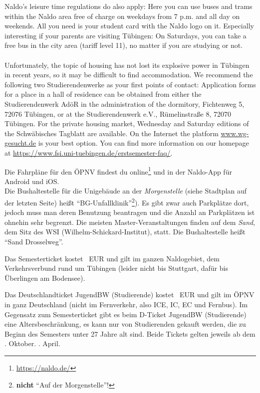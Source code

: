     Naldo's leisure time regulations do also apply: Here you can use buses and trams within the Naldo area free of charge on weekdays from 7 p.m. and all day on weekends. All you need is your student card with the Naldo logo on it.
    Especially interesting if your parents are visiting Tübingen: On Saturdays, you can take a free bus in the city area (tariff level 11), no matter if you are studying or not.\\ \\

    Unfortunately, the topic of housing has not lost its explosive power in Tübingen in recent years,
    so it may be difficult to find accommodation. We recommend the following two Studierendenwerke as your first points of contact:
    Application forms for a place in a hall of residence can be obtained from either the Studierendenwerk AdöR in the administration of the dormitory,
    Fichtenweg 5, 72076 Tübingen, or at the Studierendenwerk e.V., Rümelinstraße 8, 72070 Tübingen. For the private housing market, Wednesday and Saturday
    editions of the Schwäbisches Tagblatt are available.
    On the Internet the platform \url{www.wg-gesucht.de} is your best option.
    You can find more information on our homepage at \url{https://www.fsi.uni-tuebingen.de/erstsemester-faq/}.

\else

    Die Fahrpläne für den ÖPNV  findest du online\footnote{\url{https://naldo.de/}} und in der Naldo-App für Android und iOS.\\
    Die Bushaltestelle für die Unigebäude an der \emph{Morgenstelle} (siehe Stadtplan auf der letzten Seite) heißt "`BG-Unfallklinik"'\footnote{\textbf{nicht} "`Auf der Morgenstelle"'!}). Es gibt zwar auch Parkplätze dort,
    jedoch muss man deren Benutzung beantragen und die Anzahl an Parkplätzen ist ohnehin sehr begrenzt.
    \ifmaster
    Die meisten Master-Veranstaltungen finden auf dem \emph{Sand}, dem Sitz des WSI (Wilhelm-Schickard-Institut), statt. Die Bushaltestelle heißt "`Sand Drosselweg"'.
    \fi
    
    Das Semesterticket kostet \semesterticketpreis~EUR und gilt im ganzen Naldogebiet, dem Verkehrsverbund rund um Tübingen (leider nicht bis Stuttgart, dafür bis Überlingen am Bodensee).
    
    Das Deutschlandticket JugendBW (Studierende) kostet \jugendticketbwpreis~EUR und gilt im ÖPNV in ganz Deutschland (nicht im Fernverkehr, also ICE, IC, EC und Fernbus). Im Gegensatz zum Semesterticket gibt es beim D-Ticket JugendBW (Studierende) eine Altersbeschränkung,
    es kann nur von Studierenden gekauft werden, die zu Beginn des Semesters unter 27 Jahre alt sind.
    Beide Tickets gelten jeweils ab dem
    . Oktober.
    \fi
    . April.
    \fi

